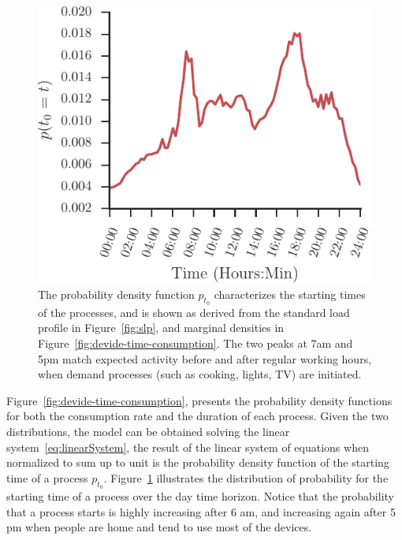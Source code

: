 \documentclass[conference]{IEEEtran}
\begin{document}
\begin{figure}[t]
\centering
\includegraphics[scale=0.8]{figures/t_0.pdf}
\caption{The probability density function $p_{t_0}$ characterizes the starting times of the processes, and is shown as derived from the standard load profile in Figure~\ref{fig:slp}, and marginal densities in Figure~\ref{fig:devide-time-consumption}. The two peaks at 7am and 5pm match expected activity before and after regular working hours, when demand processes (such as cooking, lights, TV) are initiated.}
\label{fig:distribution_t_0}
\end{figure}

Figure~\ref{fig:devide-time-consumption}, presents the probability density functions for both the consumption rate and the duration of each process. Given the two distributions, the model can be obtained solving the linear system~\eqref{eq:linearSystem}, the result of the linear system of equations when normalized to sum up to unit is the probability density function of the starting time of a process $p_{t_0}$. Figure~\ref{fig:distribution_t_0} illustrates the distribution of probability for the starting time of a process over the day time horizon. Notice that the probability that a process starts is highly increasing after 6 am, and increasing again after 5 pm when people are home and tend to use most of the devices.


\end{document}
